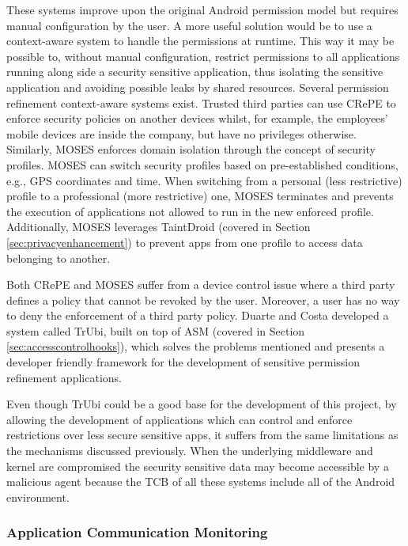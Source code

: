 These systems improve upon the original Android permission model but requires manual configuration by the user. A more useful solution would be to use a context-aware system to handle the permissions at runtime. This way it may be possible to, without manual configuration, restrict permissions to all applications running along side a security sensitive application, thus isolating the sensitive application and avoiding possible leaks by shared resources. Several permission refinement context-aware systems exist. Trusted third parties can use CRePE \cite{conti2011crepe} to enforce security policies on another devices whilst, for example, the employees' mobile devices are inside the company, but have no privileges otherwise. Similarly, MOSES \cite{russello2012moses} enforces domain isolation through the concept of security profiles. MOSES can switch security profiles based on pre-established conditions, e.g., GPS coordinates and time. When switching from a personal (less restrictive) profile to a professional (more restrictive) one, MOSES terminates and prevents the execution of applications not allowed to run in the new enforced profile. Additionally, MOSES leverages TaintDroid \cite{enck2014taintdroid} (covered in Section \ref{sec:privacyenhancement}) to prevent apps from one profile to access data belonging to another.

Both CRePE and MOSES suffer from a device control issue where a third party defines a policy that cannot be revoked by the user. Moreover, a user has no way to deny the enforcement of a third party policy. Duarte \cite{nunoduarte} and Costa \cite{miguelcosta} developed a system called TrUbi, built on top of ASM \cite{heuser2014asm} (covered in Section \ref{sec:accesscontrolhooks}), which solves the problems mentioned and presents a developer friendly framework for the development of sensitive permission refinement applications.

Even though TrUbi could be a good base for the development of this project, by allowing the development of applications which can control and enforce restrictions over less secure sensitive apps, it suffers from the same limitations as the mechanisms discussed previously. When the underlying middleware and kernel are compromised the security sensitive data may become accessible by a malicious agent because the \ac{TCB} of all these systems include all of the Android environment.

\subsubsection{Application Communication Monitoring}

